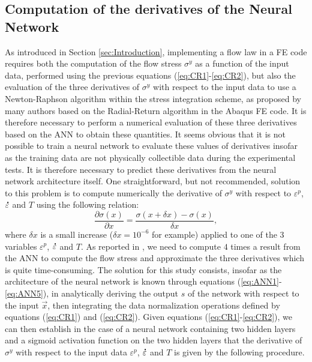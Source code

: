 \documentclass[algorithms,article,submit,pdftex,moreauthors]{Definitions/mdpi}
\DeclareRobustCommand{\mdot}[1]{\accentset{\mbox{\bfseries .}}{#1}}
\begin{document}
\subsection{Computation of the derivatives of the Neural Network}\label{sec:ANN-derivative}

As introduced in Section \ref{sec:Introduction}, implementing a flow law in a FE code requires both the computation of the flow stress $\sigma^y$ as a function of the input data, performed using the previous equations (\ref{eq:CR1}-\ref{eq:CR2}), but also the evaluation of the three derivatives of $\sigma^y$ with respect to the input data to use a Newton-Raphson algorithm within the stress integration scheme, as proposed by many authors \cite{Ponthot-2002, Ming-2018, Liang-2022, Simo-1998} based on the Radial-Return algorithm in the Abaqus FE code.
It is therefore necessary to perform a numerical evaluation of these three derivatives based on the ANN to obtain these quantities.
It seems obvious that it is not possible to train a neural network to evaluate these values of derivatives insofar as the training data are not physically collectible data during the experimental tests.
It is therefore necessary to predict these derivatives from the neural network architecture itself.
One straightforward, but not recommended, solution to this problem is to compute numerically the derivative of $\sigma^y$ with respect to $\varepsilon^p$, $\mdot\varepsilon$ and $T$ using the following relation:
\begin{equation}
\frac{\partial \sigma(x)}{\partial x} = \frac{\sigma(x+\delta x) - \sigma(x)}{\delta x},
\end{equation}
where $\delta x$ is a small increase ($\delta x=10^{-6}$ for example) applied to one of the $3$ variables $\varepsilon^p$, $\mdot\varepsilon$ and $T$.
As reported in \cite{Pantale-2021}, we need to compute $4$ times a result from the ANN to compute the flow stress and approximate the three derivatives which is quite time-consuming.
The solution for this study consists, insofar as the architecture of the neural network is known through equations (\ref{eq:ANN1}-\ref{eq:ANN5}), in analytically deriving the output $s$ of the network with respect to the input $\overrightarrow{x}$, then integrating the data normalization operations defined by equations (\ref{eq:CR1}) and (\ref{eq:CR2}).
Given equations (\ref{eq:CR1}-\ref{eq:CR2}), we can then establish in the case of a neural network containing two hidden layers and a sigmoid activation function on the two hidden layers that the derivative of $\sigma^y$ with respect to the input data $\varepsilon^p$, $\mdot\varepsilon$ and $T$ is given by the following procedure.
\end{document}
